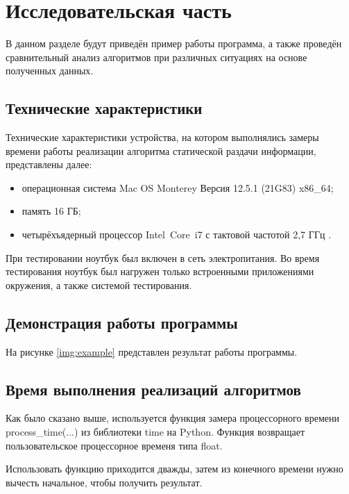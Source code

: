 \chapter{Исследовательская часть}

В данном разделе будут приведён пример работы программа, а также проведён сравнительный анализ алгоритмов при различных ситуациях на основе полученных данных.

\section{Технические характеристики}

Технические характеристики устройства, на котором выполнялись замеры времени работы реализации алгоритма статической раздачи информации, представлены далее:

\begin{itemize}
	\item операционная система Mac OS Monterey Версия 12.5.1 (21G83) \cite{macos} x86\_64;
	\item память 16 ГБ;
	\item четырёхъядерный процессор Intel Core i7 с тактовой частотой 2,7 ГГц \cite{intel}.
\end{itemize}

При тестировании ноутбук был включен в сеть электропитания. Во время тестирования ноутбук был нагружен только встроенными приложениями окружения, а также системой тестирования.

\section{Демонстрация работы программы}

На рисунке \ref{img:example} представлен результат работы программы.

\clearpage

\section{Время выполнения реализаций алгоритмов}

Как было сказано выше, используется функция замера процессорного времени process\_time(...) из библиотеки time на Python. Функция возвращает пользовательское процессорное временя типа float.

Использовать функцию приходится дважды, затем из конечного времени нужно вычесть начальное, чтобы получить результат.

